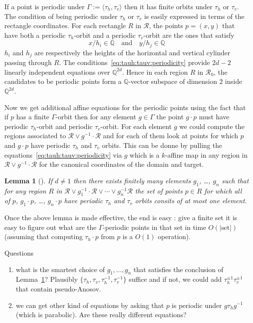 \documentclass[a4paper,12pt]{article}
\def\bQ{\mathbb{Q}}
\newtheorem{lemma}[definition]{Lemma}
\begin{document}
If a point is periodic under $\Gamma := \langle \tau_h, \tau_v \rangle$
then it has finite orbits under $\tau_h$ or $\tau_v$. The condition
of being periodic under $\tau_h$ or $\tau_v$ is easily expressed
in terms of the rectangle coordinates. For each rectangle $R$
in $\mathcal{R}$, the points $p=(x,y)$ that have both a
periodic $\tau_h$-orbit and a periodic $\tau_v$-orbit are the
ones that satisfy
\begin{equation}
\label{eq:tauh:tauv:periodicity}
x / h_i \in \bQ
\quad \text{and} \quad
y / h_j \in \bQ
\end{equation}
$h_i$ and $h_j$ are respectively the heights of the horizontal and
vertical cylinder passing through $R$. The conditions~\eqref{eq:tauh:tauv:periodicity}
provide $2d-2$ linearly independent equations over $\bQ^{2d}$. Hence in each region
$R$ in $\mathcal{R}_0$, the candidates to be periodic
points form a $\bQ$-vector subspace of dimension $2$ inside $\bQ^{2d}$.

Now we get additional affine equations for the periodic points using the fact
that if $p$ has a finite $\Gamma$-orbit then for any element $g \in \Gamma$ the
point $g \cdot p$ must have periodic $\tau_h$-orbit and periodic $\tau_v$-orbit.
For each element $g$ we could compute the regions associated to
$\mathcal{R} \vee g^{-1} \cdot \mathcal{R}$ and for
each of them look at points for which $p$ and $g \cdot p$ have periodic
$\tau_h$ and $\tau_v$ orbits. This can be donne by pulling the
equations~\eqref{eq:tauh:tauv:periodicity} via $g$ which is
a $k$-affine map in any region in $\mathcal{R} \vee g^{-1} \cdot \mathcal{R}$
for the canonical coordinates of the domain and target.

\begin{lemma}[\cite{ChowdhuryEverettFreedmanLee}]
\label{lem:finitely:many:g}
If $d\not=1$ then there
exists finitely many elements $g_1$, \ldots, $g_n$ such that
for any region $R$ in $\mathcal{R} \vee g_1^{-1} \cdot \mathcal{R} \vee \cdots \vee g_n^{-1} \mathcal{R}$
the set of points $p \in R$ for which all of $p$, $g_1 \cdot p$,
\ldots, $g_n \cdot p$ have periodic $\tau_h$ and $\tau_v$ orbits
consits of at most one element.
\end{lemma}

Once the above lemma is made effective, the end is easy : give a finite
set it is easy to figure out what are the $\Gamma$-periodic points
in that set in time $O(|\text{set}|)$ (assuming that computing
$\tau_h \cdot p$ from $p$ is a $O(1)$ operation).

Questions
\begin{enumerate}
\item what is the smartest choice of $g_1, \ldots, g_n$ that satisfies
the conclusion of Lemma~\ref{lem:finitely:many:g}? Plausibly
$\{\tau_h, \tau_v, \tau_h^{-1}, \tau_v^{-1}\}$ suffice and if not, we could
add $\tau_h^{\pm 1} \tau_v^{\pm 1}$ that contain pseudo-Anosov.
\item we can get other kind of equations by asking that $p$ is periodic
under $g \tau_h g^{-1}$ (which is parabolic). Are these really
different equations?
\end{enumerate}
\end{document}
